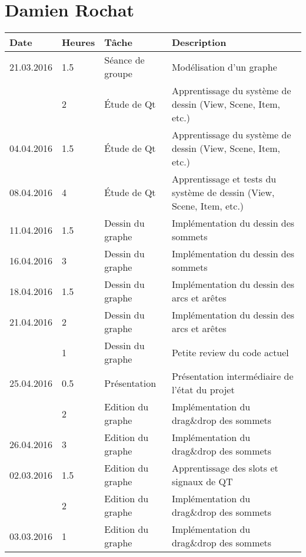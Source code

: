 \documentclass[french]{article}
\begin{document}
	\section*{Damien Rochat}
	\begin{tabular}{p{}|p{}|p{}|p{}}
		Date & Heures & Tâche & Description \\
		\hline \hline
		21.03.2016 & 1.5 & Séance de groupe & Modélisation d'un graphe \\	
		           & 2 & Étude de Qt & Apprentissage du système de dessin (View, Scene, Item, etc.) \\
		\hline
		04.04.2016 & 1.5 & Étude de Qt & Apprentissage du système de dessin (View, Scene, Item, etc.) \\
		\hline
		08.04.2016 & 4 & Étude de Qt & Apprentissage et tests du système de dessin (View, Scene, Item, etc.) \\
		\hline
		11.04.2016 & 1.5 & Dessin du graphe & Implémentation du dessin des sommets \\
		\hline
		16.04.2016 & 3 & Dessin du graphe & Implémentation du dessin des sommets \\
		\hline
		18.04.2016 & 1.5 & Dessin du graphe & Implémentation du dessin des arcs et arêtes \\
		\hline
		21.04.2016 & 2 & Dessin du graphe & Implémentation du dessin des arcs et arêtes \\
		           & 1 & Dessin du graphe & Petite review du code actuel \\

		\hline
		25.04.2016 & 0.5 & Présentation & Présentation intermédiaire de l'état du projet \\
		           & 2 & Edition du graphe & Implémentation du drag\&drop des sommets \\
		\hline
		26.04.2016 & 3 & Edition du graphe & Implémentation du drag\&drop des sommets \\
		\hline
		02.03.2016 & 1.5 & Edition du graphe & Apprentissage des slots et signaux de QT \\		 
		           & 2 & Edition du graphe & Implémentation du drag\&drop des sommets \\
		\hline
		03.03.2016 & 1 & Edition du graphe & Implémentation du drag\&drop des sommets \\
		\hline
	\end{tabular}
	
\end{document}
